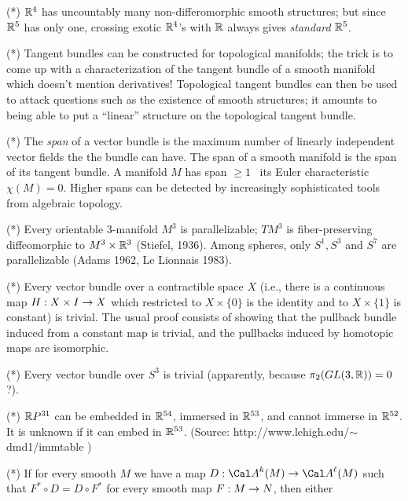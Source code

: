 \ssk

\noindent (*) ${\Bbb R}^4$ has uncountably many non-differomorphic smooth structures; but since ${\Bbb R}^5$
has only one, crossing exotic ${\Bbb R}^4$'s with ${\Bbb R}$ always gives {\it standard} ${\Bbb R}^5$.

\ssk

\noindent (*) Tangent bundles can be constructed for topological manifolds; the trick is to come up
with a characterization of the tangent bundle of a smooth manifold which doesn't mention
derivatives! Topological tangent bundles can then be used to attack questions such as
the existence of smooth structures; it amounts to being able to put a ``linear'' 
structure on the topological tangent bundle. 

\ssk

\noindent (*) The {\it span} of a vector bundle is the maximum number of linearly independent vector fields
the the bundle can have. The span of a smooth manifold is the span of its tangent bundle.
A manifold $M$ has span $\geq 1$ \lra\ its Euler characteristic $\chi(M)=0$. Higher spans can
be detected by increasingly sophisticated tools from algebraic topology.

\ssk

\noindent (*) Every orientable $3$-manifold $M^3$ is parallelizable; $TM^3$ is fiber-preserving diffeomorphic to
$M^3\times {\Bbb R}^3$ (Stiefel, 1936). Among spheres, only $S^1,S^3$ and $S^7$ are parallelizable
(Adams 1962, Le Lionnais 1983).

\ssk

\noindent (*) Every vector bundle over a contractible space $X$ (i.e., there is a continuous map
$H:X\times I\rightarrow X$ which restricted to $X\times \{0\}$ is the identity and to $X\times\{1\}$ is
constant) is trivial. The usual proof consists of showing that the pullback bundle induced 
from a constant map is trivial, and the pullbacks induced by homotopic maps are isomorphic.

\ssk

\noindent (*) Every vector bundle over $S^3$ is trivial (apparently, because $\pi_2(GL(3,{\Bbb R}))=0$ ?).

\msk

\noindent (*) ${\Bbb R} P^{31}$ can be embedded in ${\Bbb R}^{54}$, immersed in ${\Bbb R}^{53}$, and cannot immerse in ${\Bbb R}^{52}$.
It is unknown if it can embed in ${\Bbb R}^{53}$. (Source: http://www.lehigh.edu/$\sim$dmd1/immtable )

\msk


\noindent (*) If for every smooth $M$ we have a map $D:{\Cal A}^k(M)\ra {\Cal A}^\ell(M)$ such that
$F^*\circ D=D\circ F^*$ for every smooth map $F:M\rightarrow N$, then either

